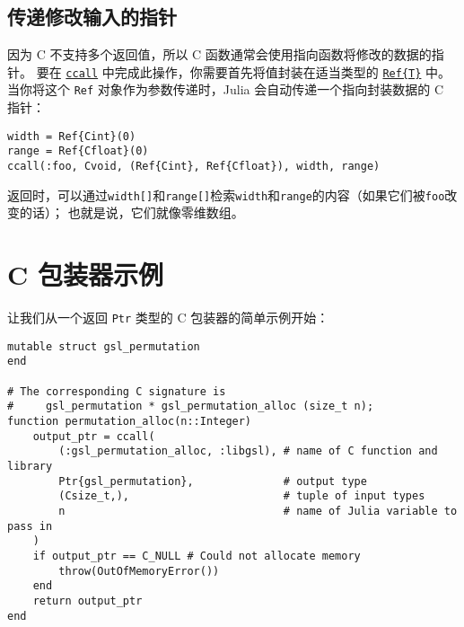 \hypertarget{11832262445711050581}{}


\subsection{传递修改输入的指针}



因为 C 不支持多个返回值，所以 C 函数通常会使用指向函数将修改的数据的指针。 要在 \hyperlink{14245046751182637566}{\texttt{ccall}} 中完成此操作，你需要首先将值封装在适当类型的 \hyperlink{7936024700322877457}{\texttt{Ref\{T\}}} 中。 当你将这个 \texttt{Ref} 对象作为参数传递时，Julia 会自动传递一个指向封装数据的 C 指针：




\begin{verbatim}
width = Ref{Cint}(0)
range = Ref{Cfloat}(0)
ccall(:foo, Cvoid, (Ref{Cint}, Ref{Cfloat}), width, range)
\end{verbatim}



返回时，可以通过\texttt{width[]}和\texttt{range[]}检索\texttt{width}和\texttt{range}的内容（如果它们被\texttt{foo}改变的话）； 也就是说，它们就像零维数组。



\hypertarget{11509619139541983993}{}


\section{C 包装器示例}



让我们从一个返回 \texttt{Ptr} 类型的 C 包装器的简单示例开始：




\begin{verbatim}
mutable struct gsl_permutation
end

# The corresponding C signature is
#     gsl_permutation * gsl_permutation_alloc (size_t n);
function permutation_alloc(n::Integer)
    output_ptr = ccall(
        (:gsl_permutation_alloc, :libgsl), # name of C function and library
        Ptr{gsl_permutation},              # output type
        (Csize_t,),                        # tuple of input types
        n                                  # name of Julia variable to pass in
    )
    if output_ptr == C_NULL # Could not allocate memory
        throw(OutOfMemoryError())
    end
    return output_ptr
end
\end{verbatim}



